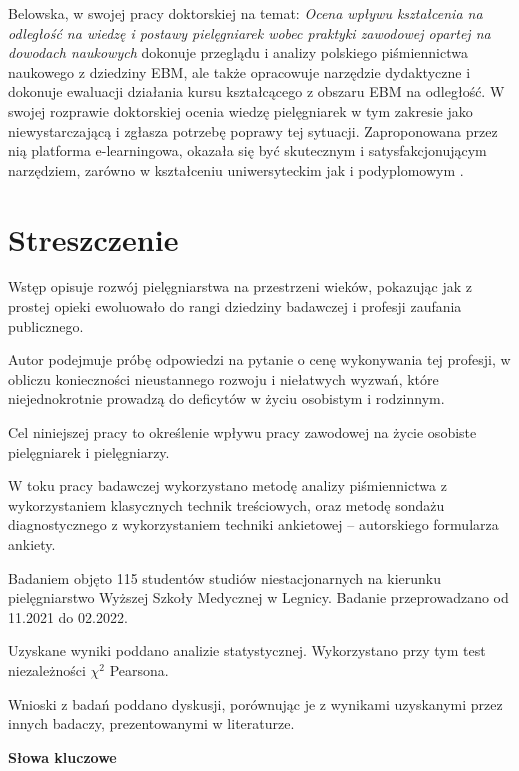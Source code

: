 \documentclass[a4paper,12pt,twoside,openright]{mwrep}
\begin{document}
Belowska, w swojej pracy doktorskiej na temat: \textit{Ocena wpływu kształcenia na odległość na wiedzę i postawy pielęgniarek wobec praktyki zawodowej opartej na dowodach naukowych} dokonuje przeglądu i analizy polskiego piśmiennictwa naukowego z dziedziny EBM, ale także opracowuje narzędzie dydaktyczne i dokonuje ewaluacji działania kursu kształcącego z obszaru EBM na odległość. W swojej rozprawie doktorskiej ocenia wiedzę pielęgniarek w tym zakresie jako niewystarczającą i zgłasza potrzebę poprawy tej sytuacji. Zaproponowana przez nią platforma e-learningowa, okazała się być skutecznym i satysfakcjonującym narzędziem, zarówno w kształceniu uniwersyteckim jak i podyplomowym \cite{belowska}.



\chapter*{Streszczenie}


Wstęp opisuje rozwój pielęgniarstwa na przestrzeni wieków, pokazując jak z prostej opieki ewoluowało do rangi dziedziny badawczej i profesji zaufania publicznego. 

Autor podejmuje próbę odpowiedzi na pytanie o cenę wykonywania tej profesji, w obliczu konieczności nieustannego rozwoju i niełatwych wyzwań, które niejednokrotnie prowadzą do deficytów w życiu osobistym i rodzinnym. 

Cel niniejszej pracy to określenie wpływu pracy zawodowej na życie osobiste pielęgniarek i pielęgniarzy.

W toku pracy badawczej wykorzystano metodę analizy piśmiennictwa z wykorzystaniem klasycznych technik treściowych, oraz metodę sondażu diagnostycznego z wykorzystaniem techniki ankietowej – autorskiego formularza ankiety. 

Badaniem objęto 115 studentów studiów niestacjonarnych na kierunku pielęgniarstwo Wyższej Szkoły Medycznej w Legnicy. Badanie przeprowadzano od 11.2021 do 02.2022.

Uzyskane wyniki poddano analizie statystycznej. Wykorzystano przy tym test niezależności $\chi^2$ Pearsona.

Wnioski z badań poddano dyskusji, porównując je z wynikami uzyskanymi przez innych badaczy, prezentowanymi w literaturze.

\vspace{\baselineskip} 
\vspace{\baselineskip} 
\vspace{\baselineskip} 
\large
\textbf{Słowa kluczowe}
\normalsize
\end{document}
